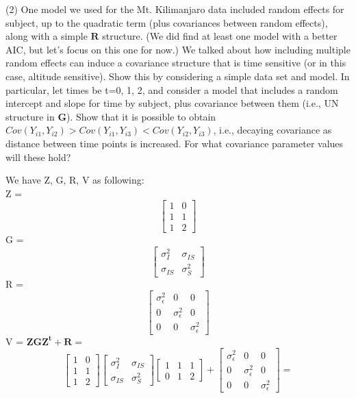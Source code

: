 \documentclass[12pt, utf8]{article}
\begin{document}
\begin{problem}
(2) One model we used for the Mt. Kilimanjaro data included random effects for subject, up to the quadratic term (plus covariances between random effects), along with a simple $\boldsymbol{R}$  structure.  (We did find at least one model with a better AIC, but let’s focus on this one for now.)  We talked about how including multiple random effects can induce a covariance structure that is time sensitive (or in this case, altitude sensitive).  Show this by considering a simple data set and model.  In particular, let times be t=0, 1, 2, and consider a model that includes a random intercept and slope for time by subject, plus covariance between them (i.e., UN structure in $\boldsymbol{G}$).  Show that it is possible to obtain $Cov(Y_{i1},Y_{i2}) > Cov(Y_{i1},Y_{i3}) < Cov(Y_{i2},Y_{i3})$, i.e., decaying covariance as distance between time points is increased.  For what covariance parameter values will these hold?
\end{problem}
We have Z, G, R, V as following: \\
Z = 
\[
\begin{bmatrix}
1 & 0 \\
1 & 1 \\
1 & 2 
\end{bmatrix}
\]
G = 
\[
\begin{bmatrix}
\sigma^2_{I} & \sigma_{IS} \\
\sigma_{IS} & \sigma^2_{S}
\end{bmatrix}
\]
R = 
\[
\begin{bmatrix}
\sigma^2_{\epsilon} & 0 & 0 \\
0 & \sigma^2_{\epsilon} & 0 \\
0 & 0 & \sigma^2_{\epsilon} 
\end{bmatrix}
\]
V = $\boldsymbol{ZGZ^t + R} = $
\[
\begin{bmatrix}
1 & 0 \\
1 & 1 \\
1 & 2 
\end{bmatrix}
\begin{bmatrix}
\sigma^2_{I} & \sigma_{IS} \\
\sigma_{IS} & \sigma^2_{S}
\end{bmatrix}
\begin{bmatrix}
1 & 1 & 1 \\
0 & 1 & 2
\end{bmatrix}
+ 
\begin{bmatrix}
\sigma^2_{\epsilon} & 0 & 0 \\
0 & \sigma^2_{\epsilon} & 0 \\
0 & 0 & \sigma^2_{\epsilon} 
\end{bmatrix}
= 
\]
\end{document}
